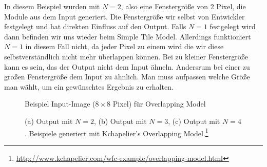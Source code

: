 \documentclass[12pt, a4paper,twoside,openright]{report}
\begin{document}
In diesem Beispiel wurden mit $N = 2$, also eine Fenstergröße von 2 Pixel, die Module aus dem Input generiert.
Die Fenstergröße wir selbst von Entwickler festgelegt und hat direkten Einfluss auf den Output.
Falls $N = 1$ festgelegt wird dann befinden wir uns wieder beim Simple Tile Model.
Allerdings funktioniert $N = 1$ in diesem Fall nicht, da jeder Pixel zu einem  wird die wir diese selbstverständlich nicht mehr überlappen können.
Bei zu kleiner Fenstergröße kann es sein, das der Output nicht dem Input ähneln.
Andersrum bei einer zu großen Fenstergröße dem Input zu ähnlich.
Man muss aufpassen welche Größe man wählt, um ein gewünschtes Ergebnis zu erhalten.

\begin{figure}[H]
    \centering
    \caption{Beispiel Input-Image ($8\times8$ Pixel) für Overlapping Model}%
\end{figure}

\begin{figure}[H]
    \centering
    \qquad
    \qquad
    \caption[]{(a) Output mit $N = 2$, (b) Output mit $N = 3$, (c) Output mit $N = 4$. Beispiele generiert mit Kchapelier's Overlapping Model.\footnote[3]{\url{http://www.kchapelier.com/wfc-example/overlapping-model.html}}}
\end{figure}
\end{document}
